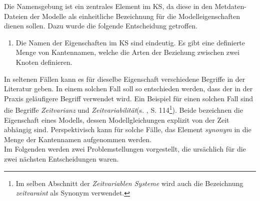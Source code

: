 Die Namensgebung ist ein zentrales Element im KS, da diese in den Metdaten-Dateien der Modelle als einheitliche Bezeichnung für die Modelleigenschaften dienen sollen. Dazu wurde die folgende Entscheidung getroffen.
\begin{enumerate}[resume*]
	\item \label{E.KS_Namensgebung}Die Namen der Eigenschaften im KS sind eindeutig. Es gibt eine definierte Menge von Kantennamen, welche die Arten der Beziehung zwischen zwei Knoten definieren.
\end{enumerate}
In seltenen Fällen kann es für dieselbe Eigenschaft verschiedene Begriffe in der Literatur geben. In einem solchen Fall soll so entschieden werden, dass der in der Praxis geläufigere Begriff verwendet wird. Ein Beispiel für einen solchen Fall sind die Begriffe \textit{Zeitvarianz} und \textit{Zeitvariabilität}(s. \cite{LUN10}, S. 114\footnote{Im selben Abschnitt der \textit{Zeitvariablen Systeme} wird auch die Bezeichnung \textit{zeitvaraint} als Synonym verwendet.}). Beide bezeichnen die Eigenschaft eines Modells, dessen Modellgleichungen explizit von der Zeit abhängig sind. Perspektivisch kann für solche Fälle, das Element \textit{synonym} in die Menge der Kantennamen aufgenommen werden.\\
Im Folgenden werden zwei Problemstellungen vorgestellt, die ursächlich für die zwei nächsten Entscheidungen waren.

